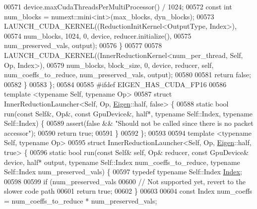 \begin{DoxyCode}
00571                            device.maxCudaThreadsPerMultiProcessor() / 1024;
00572       \textcolor{keyword}{const} \textcolor{keywordtype}{int} num\_blocks = numext::mini<int>(max\_blocks, dyn\_blocks);
00573       LAUNCH\_CUDA\_KERNEL((ReductionInitKernel<OutputType, Index>),
00574                          num\_blocks, 1024, 0, device, reducer.initialize(),
00575                          num\_preserved\_vals, output);
00576     \}
00577 
00578     LAUNCH\_CUDA\_KERNEL((InnerReductionKernel<num\_per\_thread, Self, Op, Index>),
00579                        num\_blocks, block\_size, 0, device, reducer, \textcolor{keyword}{self}, num\_coeffs\_to\_reduce, 
      num\_preserved\_vals, output);
00580 
00581     \textcolor{keywordflow}{return} \textcolor{keyword}{false};
00582   \}
00583 \};
00584 
00585 \textcolor{preprocessor}{#ifdef EIGEN\_HAS\_CUDA\_FP16}
00586 \textcolor{keyword}{template} <\textcolor{keyword}{typename} Self, \textcolor{keyword}{typename} Op>
00587 \textcolor{keyword}{struct }InnerReductionLauncher<Self, Op, \hyperlink{namespace_eigen}{Eigen}::half, false> \{
00588   \textcolor{keyword}{static} \textcolor{keywordtype}{bool} run(\textcolor{keyword}{const} Self&, Op&, \textcolor{keyword}{const} GpuDevice&, half*, \textcolor{keyword}{typename} Self::Index, \textcolor{keyword}{typename} Self::Index) \{
00589     assert(\textcolor{keyword}{false} && \textcolor{stringliteral}{"Should not be called since there is no packet accessor"});
00590     \textcolor{keywordflow}{return} \textcolor{keyword}{true};
00591   \}
00592 \};
00593 
00594 \textcolor{keyword}{template} <\textcolor{keyword}{typename} Self, \textcolor{keyword}{typename} Op>
00595 \textcolor{keyword}{struct }InnerReductionLauncher<Self, Op, \hyperlink{namespace_eigen}{Eigen}::half, true> \{
00596   \textcolor{keyword}{static} \textcolor{keywordtype}{bool} run(\textcolor{keyword}{const} Self& \textcolor{keyword}{self}, Op& reducer, \textcolor{keyword}{const} GpuDevice& device, half* output, \textcolor{keyword}{typename} 
      Self::Index num\_coeffs\_to\_reduce, \textcolor{keyword}{typename} Self::Index num\_preserved\_vals) \{
00597     \textcolor{keyword}{typedef} \textcolor{keyword}{typename} Self::Index \hyperlink{namespace_eigen_a62e77e0933482dafde8fe197d9a2cfde}{Index};
00598 
00599     \textcolor{keywordflow}{if} (num\_preserved\_vals %
00600       \textcolor{comment}{// Not supported yet, revert to the slower code path}
00601       \textcolor{keywordflow}{return} \textcolor{keyword}{true};
00602     \}
00603 
00604     \textcolor{keyword}{const} Index num\_coeffs = num\_coeffs\_to\_reduce * num\_preserved\_vals;

\end{DoxyCode}
